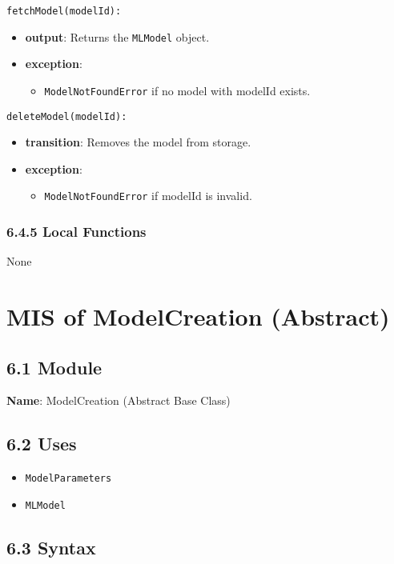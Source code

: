 \documentclass[12pt, titlepage]{article}
\begin{document}
\noindent \texttt{fetchModel(modelId):}
\begin{itemize}
    \item \textbf{output}: Returns the \texttt{MLModel} object.
    \item \textbf{exception}:
    \begin{itemize}
        \item \texttt{ModelNotFoundError} if no model with modelId exists.
    \end{itemize}
\end{itemize}

\noindent \texttt{deleteModel(modelId):}
\begin{itemize}
    \item \textbf{transition}: Removes the model from storage.
    \item \textbf{exception}:
    \begin{itemize}
        \item \texttt{ModelNotFoundError} if modelId is invalid.
    \end{itemize}
\end{itemize}

\subsubsection{6.4.5 Local Functions}
None

\newpage


\section{MIS of ModelCreation (Abstract)}
\label{sec:ModelCreationAbstract}

\subsection{6.1 Module}
\textbf{Name}: ModelCreation (Abstract Base Class)

\subsection{6.2 Uses}
\begin{itemize}
    \item \texttt{ModelParameters}
    \item \texttt{MLModel}
\end{itemize}

\subsection{6.3 Syntax}
\end{document}
